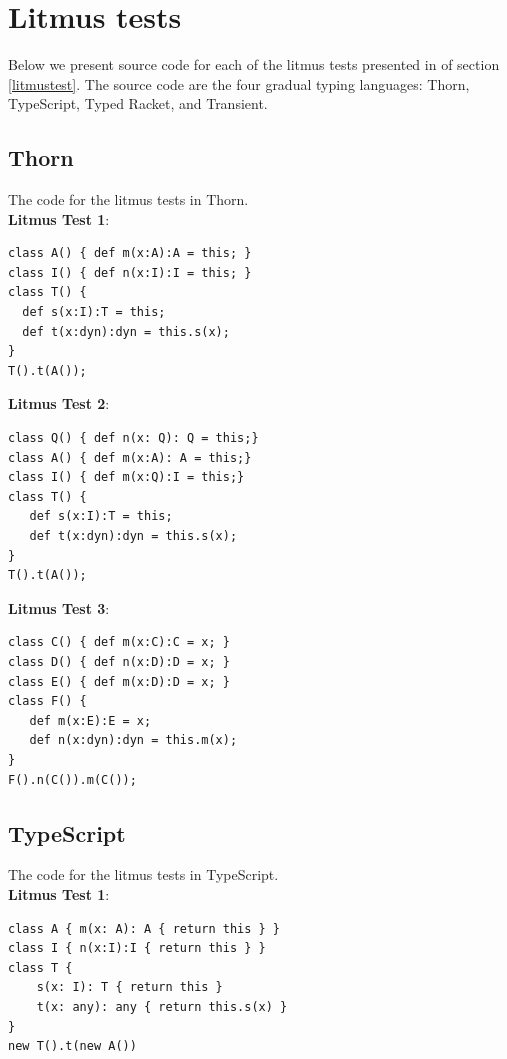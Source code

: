\documentclass{tex/llncs}
\begin{document}
\clearpage

\section{Litmus tests}

Below we present source code for each of the litmus tests presented in
 of section \ref{litmustest}. The source code are
the four gradual typing languages: Thorn, TypeScript, Typed Racket, and Transient.

\subsection*{Thorn}

The code for the litmus tests in Thorn. \\ 

\noindent
\textbf{Litmus Test 1}:
\begin{verbatim}
class A() { def m(x:A):A = this; }
class I() { def n(x:I):I = this; }
class T() {
  def s(x:I):T = this;
  def t(x:dyn):dyn = this.s(x);
}
T().t(A());
\end{verbatim}

\noindent
\textbf{Litmus Test 2}:
\begin{verbatim}
class Q() { def n(x: Q): Q = this;}
class A() { def m(x:A): A = this;}
class I() { def m(x:Q):I = this;}
class T() {
   def s(x:I):T = this; 
   def t(x:dyn):dyn = this.s(x);
}
T().t(A());   
\end{verbatim}


\noindent\textbf{Litmus Test 3}:
\begin{verbatim}
class C() { def m(x:C):C = x; }
class D() { def n(x:D):D = x; }
class E() { def m(x:D):D = x; }      
class F() {
   def m(x:E):E = x;
   def n(x:dyn):dyn = this.m(x);
} 
F().n(C()).m(C());
\end{verbatim}

\subsection*{TypeScript}

The code for the litmus tests in TypeScript. \\

\noindent\textbf{Litmus Test 1}:
\begin{verbatim}
class A { m(x: A): A { return this } }
class I { n(x:I):I { return this } }
class T {
    s(x: I): T { return this }
    t(x: any): any { return this.s(x) }
}
new T().t(new A())
\end{verbatim}
\end{document}
